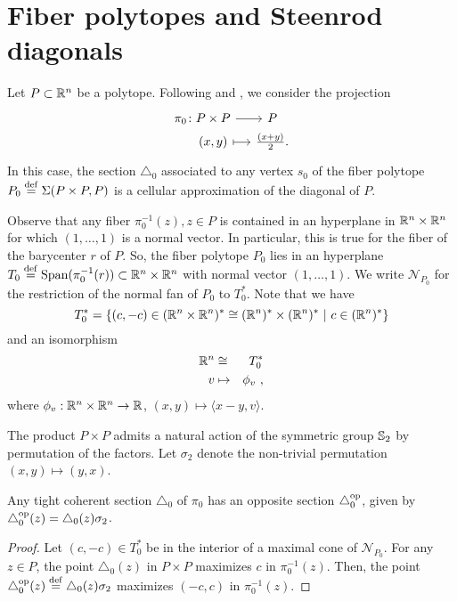 
\section{Fiber polytopes and Steenrod diagonals} \label{s:fiber polytopes and Steenrod diagonals}

Let $P \subset \mathbb{R}^n$ be a polytope.
Following \cite{MTTV19} and \cite{GLA21}, we consider the projection
\[
\begin{tikzcd}[row sep=0, column sep=small]
\pi_0 \colon P \times P \arrow{r} & P \\
\phantom{\pi_0 \colon} (x,y) \arrow[r, |->] & \frac{(x+y)}{2}.
\end{tikzcd}
\]
In this case, the section $\triangle_0$ associated to any vertex $s_0$ of the fiber polytope $P_0 \stackrel{\mathrm{def}}{=} \Sigma(P \times P,P)$ is a cellular approximation of the diagonal of $P$.

Observe that any fiber $\pi_0^{-1}(z), z \in P$ is contained in an hyperplane in $\mathbb{R}^n\times\mathbb{R}^n$ for which $(1, \dots, 1)$ is a normal vector.
In particular, this is true for the fiber of the barycenter $r$ of $P$.
So, the fiber polytope $P_0$ lies in an hyperplane $T_0 \stackrel{\mathrm{def}}{=} \operatorname{\mathrm{Span}} (\pi_0^{-1}(r)) \subset \mathbb{R}^n \times \mathbb{R}^n$ with normal vector $(1,\ldots,1)$.
We write $\mathcal{N}_{P_0}$ for the restriction of the normal fan of $P_0$ to $T_0^{*}$. Note that we have $$T_0^{*}=\{(c,-c) \in (\mathbb{R}^n \times \mathbb{R}^n)^{*}\cong (\mathbb{R}^n)^{*}\times (\mathbb{R}^n)^{*} \ | \ c \in (\mathbb{R}^n)^{*}\}$$
and an isomorphism
\begin{eqnarray*}
    \mathbb{R}^n & \cong & T_0^{*} \\
    v & \mapsto & \phi_v \ ,
\end{eqnarray*}
where $\phi_v : \mathbb{R}^n \times \mathbb{R}^n \to \mathbb{R}$, $(x,y) \mapsto \langle x-y, v \rangle$.

The product $P \times P$ admits a natural action of the symmetric group $\mathbb{S}_2$ by permutation of the factors.
Let $\sigma_2$ denote the non-trivial permutation $(x,y)\mapsto (y,x)$.

\begin{proposition}
	Any tight coherent section $\triangle_0$ of $\pi_0$ has an opposite section $\triangle_0^{\mathrm{op}}$, given by $\triangle_0^{\mathrm{op}}(z)=\triangle_0(z)\sigma_2$.
\end{proposition}

\begin{proof}
	Let $(c,-c) \in T_0^{*}$ be in the interior of a maximal cone of $\mathcal{N}_{P_0}$.
	For any $z\in P$, the point $\triangle_0(z)$ in $P \times P$ maximizes $c$ in $\pi_0^{-1}(z)$.
	Then, the point $\triangle_0^{\mathrm{op}}(z) \stackrel{\mathrm{def}}{=} \triangle_0(z)\sigma_2$ maximizes $(-c,c)$ in $\pi_0^{-1}(z)$.
\end{proof}

